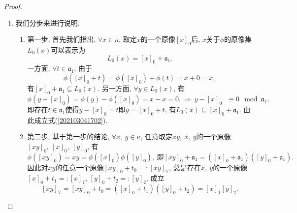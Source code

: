 \documentclass[UTF8, twoside]{ctexart}
\theoremstyle{nonumberplain}
\newtheorem{proof}{\heiti 证明}  %
\theoremstyle{nonumberplain}
\theoremstyle{plain}
\begin{document}
\begin{proof}
\begin{enumerate}
			\item 我们分步来进行说明. 
			\vskip 0.3cm
			\begin{enumerate}
				\item 第一步, 首先我们指出, $\forall x\in \kappa $, 取定$x$的一个原像${{\left[ x \right]}_{0}}$后, $x$关于$\phi $的原像集${{L}_{0}}\left( x \right)$可以表示为
				\begin{equation} \label{202103041702}
					{{L}_{0}}\left( x \right)={{\left[ x \right]}_{0}}+{{\mathfrak{a}}_{1}}.
				\end{equation}
				一方面, $\forall t\in {{\mathfrak{a}}_{1}}$, 由于
				\[
					\phi \left( {{\left[ x \right]}_{0}}+t \right)=\phi \left( {{\left[ x \right]}_{0}} \right)+\phi \left( t \right)=x+0=x,
				\]
				有${{\left[ x \right]}_{0}}+{{\mathfrak{a}}_{1}}\subseteq {{L}_{0}}\left( x \right)$. 另一方面, $\forall y\in {{L}_{0}}\left( x \right)$, 有
				\[
					\phi \left( y-{{\left[ x \right]}_{0}} \right)=\phi \left( y \right)-\phi \left( {{\left[ x \right]}_{0}} \right)=x-x=0.
					\ \Longrightarrow \ 
					y-{{\left[ x \right]}_{0}}\text{ }\equiv 0\ \bmod {{\mathfrak{a}}_{1}},
				\]
				即存在$t\in {{\mathfrak{a}}_{1}}$使得$y-{{\left[ x \right]}_{0}}=t$即$y={{\left[ x \right]}_{0}}+t$, 有${{L}_{0}}\left( x \right)\subseteq {{\left[ x \right]}_{0}}+{{\mathfrak{a}}_{1}}$. 
				由此成立式(\ref{202103041702}).
				\vskip 0.3cm
				
				\item 第二步, 基于第一步的结论, $\forall x,\ y\in \kappa $, 任意取定$xy,\ x,\ y$的一个原像${{\left[ xy \right]}_{0}},\ {{\left[ x \right]}_{0}},\ {{\left[ y \right]}_{0}}$, 有
				\[
					\phi \left( {{\left[ xy \right]}_{0}} \right)=xy=\phi \left( {{\left[ x \right]}_{0}} \right)\phi \left( {{\left[ y \right]}_{0}} \right),\ \text{即}{{\left[ xy \right]}_{0}}+{{\mathfrak{a}}_{1}}=\left( {{\left[ x \right]}_{0}}+{{\mathfrak{a}}_{1}} \right)\left( {{\left[ y \right]}_{0}}+{{\mathfrak{a}}_{1}} \right).
				\]
				因此对$xy$的任意一个原像${{\left[ xy \right]}_{0}}+{{t}_{0}}=:{{\left[ xy \right]}_{\forall }}$, 总是存在$x,\ y$的一个原像${{\left[ x \right]}_{0}}+{{t}_{1}}=:{{\left[ x \right]}_{1}}$, ${{\left[ y \right]}_{0}}+{{t}_{2}}=:{{\left[ y \right]}_{2}}$, 成立
				\begin{equation} \label{202103041704}
					{{\left[ xy \right]}_{\forall }}={{\left[ xy \right]}_{0}}+{{t}_{0}}=\left( {{\left[ x \right]}_{0}}+{{t}_{1}} \right)\left( {{\left[ y \right]}_{0}}+{{t}_{2}} \right)={{\left[ x \right]}_{1}}{{\left[ y \right]}_{2}}.
				\end{equation}
			\vskip 0.3cm
			

\end{enumerate}
\end{enumerate}
\end{proof}
\end{document}
